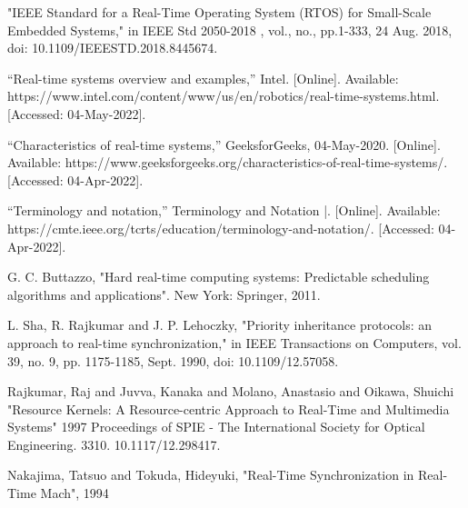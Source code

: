 \documentclass[conference]{IEEEtran}
\begin{document}
\begin{thebibliography}{00}

"IEEE Standard for a Real-Time Operating System (RTOS) for Small-Scale Embedded Systems," in IEEE Std 2050-2018 , vol., no., pp.1-333, 24 Aug. 2018, doi: 10.1109/IEEESTD.2018.8445674.

 “Real-time systems overview and examples,” Intel. [Online]. Available: https://www.intel.com/content/www/us/en/robotics/real-time-systems.html. [Accessed: 04-May-2022]. 

“Characteristics of real-time systems,” GeeksforGeeks, 04-May-2020. [Online]. Available: https://www.geeksforgeeks.org/characteristics-of-real-time-systems/. [Accessed: 04-Apr-2022]. 

 “Terminology and notation,” Terminology and Notation |. [Online]. Available: https://cmte.ieee.org/tcrts/education/terminology-and-notation/. [Accessed: 04-Apr-2022]. 

 G. C. Buttazzo, "Hard real-time computing systems: Predictable scheduling algorithms and applications". New York: Springer, 2011. 

 L. Sha, R. Rajkumar and J. P. Lehoczky, "Priority inheritance protocols: an approach to real-time synchronization," in IEEE Transactions on Computers, vol. 39, no. 9, pp. 1175-1185, Sept. 1990, doi: 10.1109/12.57058.

 Rajkumar, Raj and Juvva, Kanaka and Molano, Anastasio and Oikawa, Shuichi "Resource Kernels: A Resource-centric Approach to Real-Time and Multimedia Systems" 1997 Proceedings of SPIE - The International Society for Optical Engineering. 3310. 10.1117/12.298417. 

 Nakajima, Tatsuo and Tokuda, Hideyuki, "Real-Time Synchronization in Real-Time Mach", 1994 
\end{thebibliography}
\end{document}
